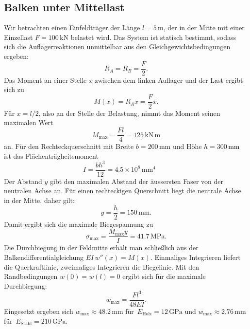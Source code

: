 \subsection{Balken unter Mittellast}
%
%
Wir betrachten einen Einfeldträger der Länge \(l = 5\,\mathrm{m}\),
der in der Mitte mit einer Einzellast \(F = 100\,\mathrm{kN}\)
belastet wird.
Das System ist statisch bestimmt, sodass sich die Auflagerreaktionen
unmittelbar aus den Gleichgewichtsbedingungen ergeben:
\[
  R_A = R_B = \frac{F}{2}.
\]
Das Moment an einer Stelle \(x\) zwischen dem linken Auflager und
der Last ergibt sich zu
\[
  M(x) = R_A   x = \frac{F}{2} x.
\]
Für \(x=l/2\), also an der Stelle der Belastung, nimmt das Moment seinen 
maximalen Wert
\begin{equation*}
  M_{\max} = \frac{F l}{4} = 125\,\mathrm{kN\,m}
  \label{eq:Mmax}
\end{equation*}
an. Für den Rechteckquerschnitt mit Breite \(b=200\,\mathrm{mm}\) 
und Höhe \(h=300\,\mathrm{mm}\) ist das Flächenträgheitsmoment
\[
  I = \frac{b h^3}{12} = 4.5 \times 10^8\,\mathrm{mm^4}
  \qquad 
\]
Der Abstand \(y\) gibt den maximalen Abstand der äussersten Faser
von der neutralen Achse an.
Für einen rechteckigen Querschnitt liegt die neutrale Achse 
in der Mitte, daher gilt:
\[
  y = \frac{h}{2}= 150\,\mathrm{mm}.
\]
Damit ergibt sich die maximale Biegespannung zu
\begin{equation*}
  \sigma_{\max} = \frac{M_{\max} y}{I} = 41.7\,\mathrm{MPa}.
  \label{eq:sigma_max}
\end{equation*}
Die Durchbiegung in der Feldmitte erhält man schließlich aus der
Balkendifferentialgleichung \(EI\,w''(x)=M(x)\).
Einmaliges Integrieren liefert die Querkraftlinie, zweimaliges
Integrieren die Biegelinie.
Mit den Randbedingungen \(w(0)=w(l)=0\) ergibt sich für die 
maximale Durchbiegung:
\begin{equation*}
  w_{\max} = \frac{F l^3}{48 E I}.
  \label{eq:wmax}
\end{equation*}
Eingesetzt ergeben sich 
\(w_{\max} \approx 48.2\,\mathrm{mm}\) für 
\(\,E_{\text{Holz}}=12\,\mathrm{GPa}\)
und
\(w_{\max} \approx 2.76\,\mathrm{mm}\) für 
\(\,E_{\text{Stahl}}=210\,\mathrm{GPa}\).

